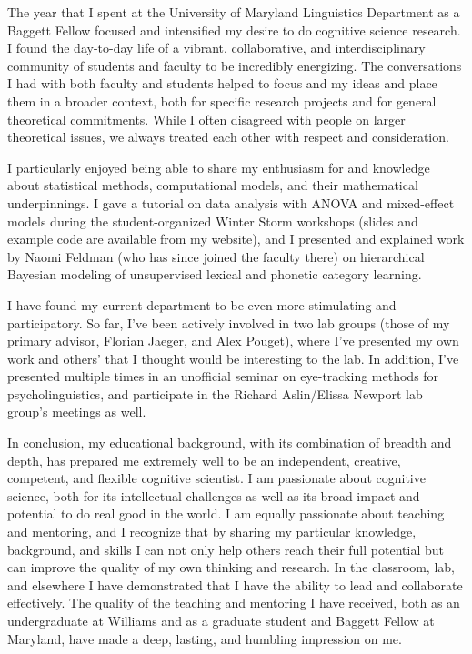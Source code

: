\documentclass[12pt]{article}
\begin{document}

The year that I spent at the University of Maryland Linguistics Department as a Baggett Fellow focused and intensified my desire to do cognitive science research.  I found the day-to-day life of a vibrant, collaborative, and interdisciplinary community of students and faculty to be incredibly energizing.  The conversations I had with both faculty and students helped to focus and my ideas and place them in a broader context, both for specific research projects and for general theoretical commitments.  While I often disagreed with people on larger theoretical issues, we always treated each other with respect and consideration.  

I particularly enjoyed being able to share my enthusiasm for and knowledge about statistical methods, computational models, and their mathematical underpinnings.  I gave a tutorial on data analysis with ANOVA and mixed-effect models during the student-organized Winter Storm workshops (slides and example code are available from my website), and I presented and explained work by Naomi Feldman (who has since joined the faculty there) on hierarchical Bayesian modeling of unsupervised lexical and phonetic category learning.

I have found my current department to be even more stimulating and participatory.  So far, I've been actively involved in two lab groups (those of my primary advisor, Florian Jaeger, and Alex Pouget), where I've presented my own work and others' that I thought would be interesting to the lab.  In addition, I've presented multiple times in an unofficial seminar on eye-tracking methods for psycholinguistics, and participate in the Richard Aslin/Elissa Newport lab group's meetings as well.


In conclusion, my educational background, with its combination of breadth and depth, has prepared me extremely well to be an independent, creative, competent, and flexible cognitive scientist.  I am passionate about cognitive science, both for its intellectual challenges as well as its broad impact and potential to do real good in the world.  I am equally passionate about teaching and mentoring, and I recognize that by sharing my particular knowledge, background, and skills I can not only help others reach their full potential but can improve the quality of my own thinking and research.  In the classroom, lab, and elsewhere I have demonstrated that I have the ability to lead and collaborate effectively.  The quality of the teaching and mentoring I have received, both as an undergraduate at Williams and as a graduate student and Baggett Fellow at Maryland, have made a deep, lasting, and humbling impression on me.  
\end{document}
